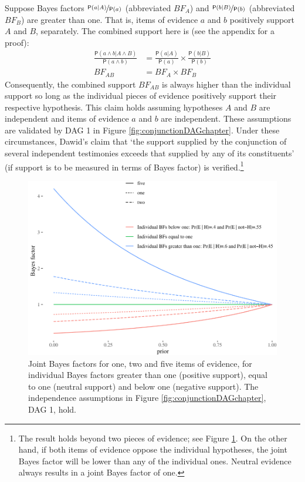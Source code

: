\documentclass[
  10pt,
  dvipsnames,enabledeprecatedfontcommands]{scrartcl}
\newcommand{\pr}[1]{\ensuremath{\mathsf{P}(#1)}}
\begin{document}
Suppose Bayes factors \(\nicefrac{\pr{a \vert A}}{\pr{a}}\) (abbreviated
\(BF_A\)) and \(\nicefrac{\pr{b \vert B}}{\pr{b}}\) (abbreviated
\(BF_B\)) are greater than one. That is, items of evidence \(a\) and
\(b\) positively support \(A\) and \(B\), separately. The combined
support here is (see the appendix for a proof): \begin{align*}
\frac{\pr{a \wedge b \vert A \wedge B}}{\pr{a \wedge b}} &= \frac{\pr{a \vert A}}{\pr{a}} \times \frac{\pr{b \vert B}}{\pr{b}}\\
BF_{AB} &= BF_{A} \times BF_{B}
\end{align*} \noindent Consequently, the combined support \(BF_{AB}\) is
always higher than the individual support so long as the individual
pieces of evidence positively support their respective hypothesis. This
claim holds assuming hypotheses \(A\) and \(B\) are independent and
items of evidence \(a\) and \(b\) are independent. These assumptions are
validated by \textsf{DAG 1} in Figure \ref{fig:conjunctionDAGchapter}.
Under these circumstances, Dawid's claim that `the support supplied by
the conjunction of several independent testimonies exceeds that supplied
by any of its constituents' (if support is to be measured in terms of
Bayes factor) is verified.\footnote{The result holds beyond two pieces
  of evidence; see Figure \ref{fig:bfconjunction5}. On the other hand,
  if both items of evidence oppose the individual hypotheses, the joint
  Bayes factor will be lower than any of the individual ones. Neutral
  evidence always results in a joint Bayes factor of one.}

\begin{figure}[h]

\begin{center}\includegraphics[width=0.9\linewidth]{conjunction-paradox4_files/figure-latex/bfconjunction5-1} \end{center}
\caption{Joint Bayes factors for one, two and five items of evidence, for individual Bayes factors greater than one (positive support), equal to one (neutral support) and below one (negative support). The independence assumptions in Figure \ref{fig:conjunctionDAGchapter}, \textsf{DAG 1}, hold.}
\label{fig:bfconjunction5}
\end{figure}
\end{document}
